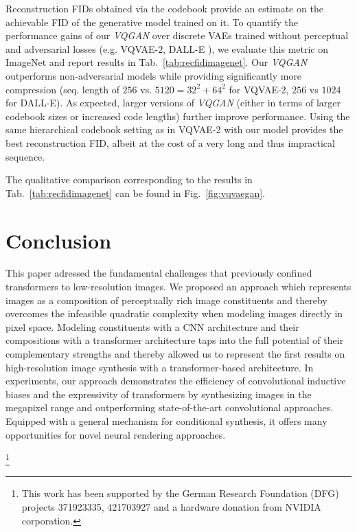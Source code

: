 Reconstruction FIDs obtained via the codebook provide an estimate on the achievable FID of the generative model trained on it. To quantify the performance gains of our \emph{VQGAN} over discrete VAEs trained without perceptual and adversarial losses (e.g. VQVAE-2, DALL-E \cite{ramesh2021zeroshot}), we evaluate this metric on ImageNet and report results in
Tab.~\ref{tab:recfidimagenet}.
Our \emph{VQGAN} outperforms non-adversarial models while providing significantly more compression (seq. length of $256$ vs. $5120=32^2+64^2$ for VQVAE-2, $256$ vs $1024$ for DALL-E). As expected, larger versions of \emph{VQGAN} (either in terms of larger codebook sizes or increased code lengths) further improve performance. Using the same hierarchical codebook setting as in VQVAE-2 with our model provides the best reconstruction FID, albeit at the cost of a very long and thus impractical sequence. 

The qualitative comparison corresponding to the results in
Tab.~\ref{tab:recfidimagenet} can be found in Fig.~\ref{fig:vqvaegan}.

\section{Conclusion}

 This paper adressed the fundamental challenges that previously confined transformers to low-resolution images. We proposed an approach which represents images as a composition of perceptually rich image constituents and thereby overcomes the infeasible quadratic complexity when modeling images directly in pixel space. Modeling constituents with a CNN architecture and their compositions with a transformer architecture taps into the full potential of their complementary strengths and thereby allowed us to represent the first results on high-resolution image synthesis with a transformer-based architecture. In experiments, our approach demonstrates the efficiency of convolutional inductive biases and the expressivity of transformers by synthesizing images in the megapixel range and outperforming state-of-the-art convolutional approaches. Equipped with a general mechanism for conditional synthesis, it offers many opportunities for novel neural rendering approaches.

  \begingroup
  \renewcommand\thefootnote{}\footnote{ This work has been supported by the German Research Foundation (DFG) projects 371923335, 421703927 and a hardware donation from NVIDIA corporation.}
  \addtocounter{footnote}{-1}
  \endgroup


